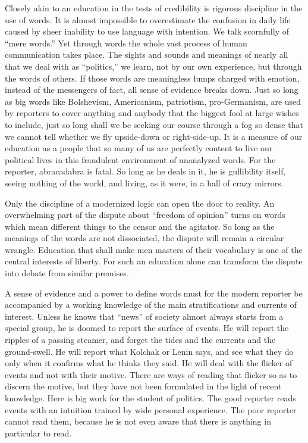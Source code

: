 \documentclass[openany,nobib,twoside,nohyper]{tufte-book}
\begin{document}
Closely akin to an education in the tests of credibility is rigorous
discipline in the use of words. It is almost impossible to overestimate
the confusion in daily life caused by sheer inability to use language
with intention. We talk scornfully of ``mere words.'' Yet through words
the whole vast process of human communication takes place. The sights
and sounds and meanings of nearly all that we deal with as ``politics,''
we learn, not by our own experience, but through the words of others. If
those words are meaningless lumps charged with emotion, instead of the
messengers of fact, all sense of evidence breaks down. Just so long as
big words like Bolshevism, Americanism, patriotism, pro-Germanism, are
used by reporters to cover anything and anybody that the biggest fool at
large wishes to include, just so long shall we be seeking our course
through a fog so dense that we cannot tell whether we fly upside-down or
right-side-up. It is a measure of our education as a people that so many
of us are perfectly content to live our political lives in this
fraudulent environment of unanalyzed words. For the reporter,
abracadabra is fatal. So long as he deals in it, he is gullibility
itself, seeing nothing of the world, and living, as it were, in a hall
of crazy mirrors.

Only the discipline of a modernized logic can open the door to reality.
An overwhelming part of the dispute about ``freedom of opinion'' turns
on words which mean different things to the censor and the agitator. So
long as the meanings of the words are not dissociated, the dispute will
remain a circular wrangle. Education that shall make men masters of
their vocabulary is one of the central interests of liberty. For such an
education alone can transform the dispute into debate from similar
premises.

A sense of evidence and a power to define words must for the modern
reporter be accompanied by a working knowledge of the main
stratifications and currents of interest. Unless he knows that ``news''
of society almost always starts from a special group, he is doomed to
report the surface of events. He will report the ripples of a passing
steamer, and forget the tides and the currents and the ground-swell. He
will report what Kolchak or Lenin says, and see what they do only when
it confirms what he thinks they said. He will deal with the flicker of
events and not with their motive. There are ways of reading that flicker
so as to discern the motive, but they have not been formulated in the
light of recent knowledge. Here is big work for the student of politics.
The good reporter reads events with an intuition trained by wide
personal experience. The poor reporter cannot read them, because he is
not even aware that there is anything in particular to read.
\end{document}
